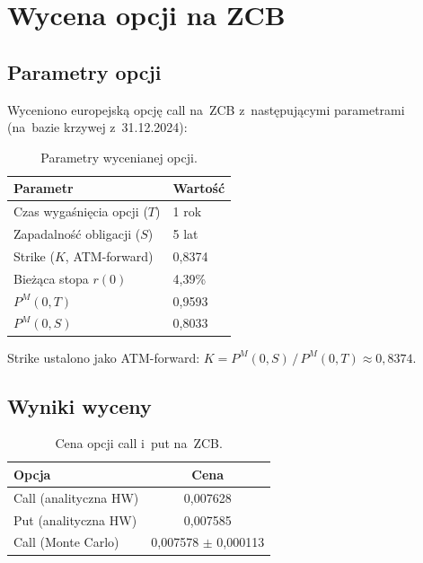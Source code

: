 \documentclass[12pt,a4paper]{article}
\begin{document}
\section{Wycena opcji na ZCB}
\label{sec:pricing}

\subsection{Parametry opcji}

Wyceniono europejską opcję call na~ZCB z~następującymi parametrami
(na~bazie krzywej z~31.12.2024):

\begin{table}[H]
  \centering
  \caption{Parametry wycenianej opcji.}
  \label{tab:option-params}
  \begin{tabular}{@{}ll@{}}
    \toprule
    \textbf{Parametr} & \textbf{Wartość} \\
    \midrule
    Czas wygaśnięcia opcji ($T$) & 1 rok \\
    Zapadalność obligacji ($S$)  & 5 lat \\
    Strike ($K$, ATM-forward)    & 0,8374 \\
    Bieżąca stopa $r(0)$        & 4,39\% \\
    $P^M(0,T)$                   & 0,9593 \\
    $P^M(0,S)$                   & 0,8033 \\
    \bottomrule
  \end{tabular}
\end{table}

Strike ustalono jako ATM-forward:
$K = P^M(0,S)\,/\,P^M(0,T) \approx 0{,}8374$.

\subsection{Wyniki wyceny}

\begin{table}[H]
  \centering
  \caption{Cena opcji call i~put na~ZCB.}
  \label{tab:prices}
  \begin{tabular}{@{}lc@{}}
    \toprule
    \textbf{Opcja}  & \textbf{Cena} \\
    \midrule
    Call (analityczna HW) & 0,007628 \\
    Put (analityczna HW)  & 0,007585 \\
    Call (Monte Carlo)    & 0,007578 $\pm$ 0,000113 \\
    \bottomrule
  \end{tabular}
\end{table}
\end{document}
